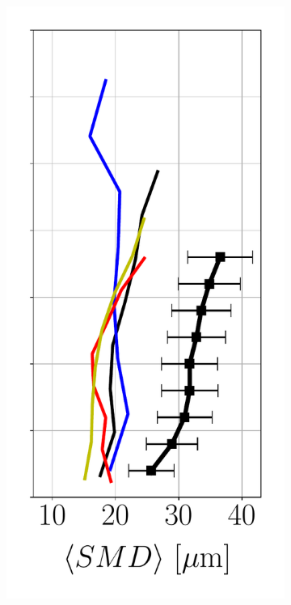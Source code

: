 \begin{figure}[ht]
\begin{subfigure}[b]{0.2\textwidth}
   \includegraphics[scale=0.35]{./part2_developments/figures_ch6_lagrangian_JICF/params_spray_velocities/profiles/SMD_along_z}
\end{subfigure}
\hspace*{0.1in}

\end{figure}
